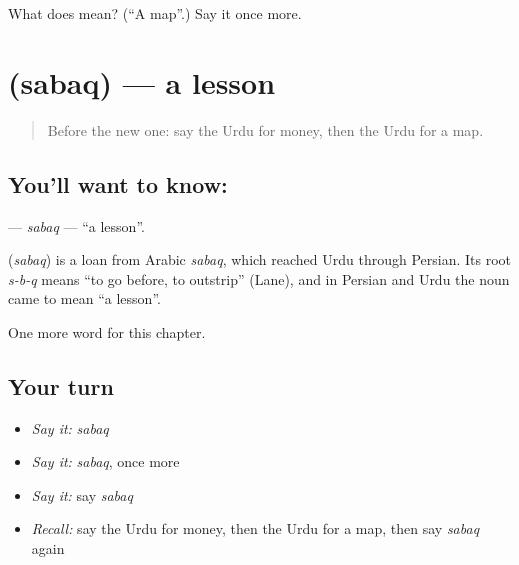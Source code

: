 \begin{tcolorbox}[breakable,colback=teal!4,colframe=teal!35!black,title={Before you move on}]
What does  mean? (\textquotedblleft{}A map\textquotedblright{}.) Say it once more.
\end{tcolorbox}
\section[\texorpdfstring{\ur{سبق} (sabaq)}{سبق (sabaq)}]{ (sabaq) — a lesson}

\label{lesson:UR-C62-sabaq}



\begin{quote}
Before the new one: say the Urdu for money, then the Urdu for a map.
\end{quote}

\subsection*{You'll want to know: }
\textbf{} — \emph{sabaq} — \textquotedblleft{}a lesson\textquotedblright{}.

\begin{cousinweb}
\textbf{} (\emph{sabaq}) is a loan from Arabic \emph{sabaq}, which reached Urdu through Persian. Its root \emph{s-b-q} means \textquotedblleft{}to go before, to outstrip\textquotedblright{} (Lane), and in Persian and Urdu the noun came to mean \textquotedblleft{}a lesson\textquotedblright{}.
\end{cousinweb}

\begin{grammarlens}[title={What you've built}]
One more word for this chapter.
\end{grammarlens}

\subsection*{Your turn}
\begin{itemize}
\raggedright
  \item \emph{Say it:} \emph{sabaq}
  \item \emph{Say it:} \emph{sabaq}, once more
  \item \emph{Say it:} say \emph{sabaq}
  \item \emph{Recall:} say the Urdu for money, then the Urdu for a map, then say \emph{sabaq} again
\end{itemize}

